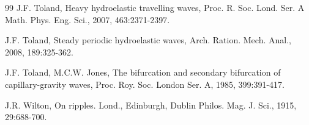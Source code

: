 \documentclass[12pt]{article}
\numberwithin{equation}{section}
\numberwithin{equation}{section}
\begin{document}
\begin{thebibliography}{99}
J.F. Toland, Heavy hydroelastic travelling waves, Proc. R. Soc. Lond. Ser. A Math. Phys. Eng. Sci., 2007, 463:2371-2397.

J.F. Toland, Steady periodic hydroelastic waves, Arch. Ration. Mech. Anal., 2008, 189:325-362.

J.F. Toland, M.C.W. Jones, The bifurcation and secondary bifurcation of capillary-gravity waves, Proc. Roy. Soc. London Ser. A, 1985, 399:391-417.


J.R. Wilton, On ripples. Lond., Edinburgh, Dublin Philos. Mag. J. Sci., 1915, 29:688-700.



\end{thebibliography}
\end{document}
